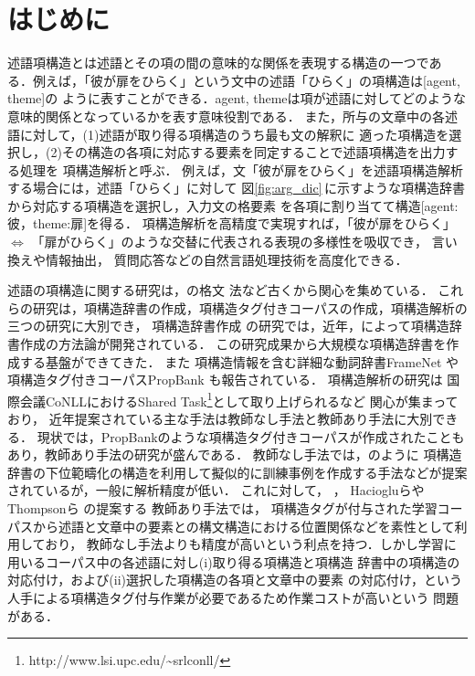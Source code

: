 \maketitle
\thispagestyle{empty}

\section{はじめに}

述語項構造とは述語とその項の間の意味的な関係を表現する構造の一つであ
る．例えば，「彼が扉をひらく」という文中の述語「ひらく」の項構造は[agent, theme]の
ように表すことができる．agent, themeは項が述語に対してどのような意味的関係となっているかを表す意味役割である．
また，所与の文章中の各述語に対して，(1)述語が取り得る項構造のうち最も文の解釈に
適った項構造を選択し，(2)その構造の各項に対応する要素を同定することで述語項構造を出力する処理を
項構造解析と呼ぶ．
例えば，文「彼が扉をひらく」を述語項構造解析する場合には，述語「ひらく」に対して
図\ref{fig:arg_dic}\,に示すような項構造辞書
から対応する項構造を選択し，入力文の格要素
を各項に割り当てて構造[agent:彼，theme:扉]を得る．
項構造解析を高精度で実現すれば，「彼が扉をひらく」$\Leftrightarrow$ 「扉がひらく」のような交替に代表される表現の多様性を吸収でき，
言い換えや情報抽出，
質問応答などの自然言語処理技術を高度化できる．


述語の項構造に関する研究は，の格文
法など古くから関心を集めている．
これらの研究は，項構造辞書の作成，項構造タグ付きコーパスの作成，項構造解析の三つの研究に大別でき，
項構造辞書作成
の研究では，近年，によって項構造辞書作成の方法論が開発されている．
この研究成果から大規模な項構造辞書を作成する基盤ができてきた．
また
項構造情報を含む詳細な動詞辞書FrameNet \cite{Frame:98}や
項構造タグ付きコーパスPropBank \cite{Prop:02}
も報告されている．
項構造解析の研究は
国際会議CoNLLにおけるShared Task\footnote{http://www.lsi.upc.edu/\~{}srlconll/}として取り上げられるなど
関心が集まっており，
近年提案されている主な手法は教師なし手法と教師あり手法に大別できる．
現状では，PropBankのような項構造タグ付きコーパスが作成されたこともあり，教師あり手法の研究が盛んである．
教師なし手法では，のように
項構造辞書の下位範疇化の構造を利用して擬似的に訓練事例を作成する手法などが提案されているが，一般に解析精度が低い．
これに対して，
，
Haciogluら\citeyear{Kadri:03}や
Thompsonら\citeyear{Cyn:03}
の提案する
教師あり手法では，
項構造タグが付与された学習コーパスから述語と文章中の要素との構文構造における位置関係などを素性として利用しており，
教師なし手法よりも精度が高いという利点を持つ．しかし学習に用いるコーパス中の各述語に対し(i)取り得る項構造と項構造
辞書中の項構造の対応付け，および(ii)選択した項構造の各項と文章中の要素
の対応付け，という人手による項構造タグ付与作業が必要であるため作業コストが高いという
問題がある．

